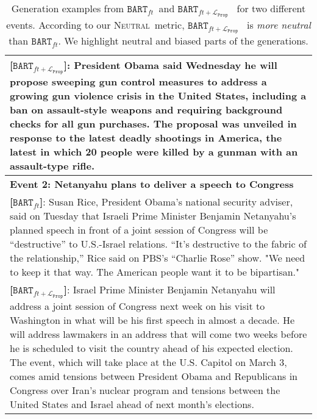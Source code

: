 \documentclass[11pt,a4paper]{article}
\newcommand{\neutral}{\textsc{Neutral}}
\newcommand{\finetune}{$\texttt{BART}_{ft}$}
\newcommand{\prop}{$\texttt{BART}_{ft+\mathcal{L}_\texttt{Prop}}$}
\begin{document}
\begin{table*}[t]
\begin{tabular}{p{15cm}}
\textbf{{[}\prop{]}}: President Obama said Wednesday he will propose sweeping gun control measures to \colorbox{mygreen}{address a growing gun violence} crisis in the United States, including a ban on assault-style weapons and requiring background checks for all gun purchases. The proposal was unveiled \colorbox{mygreen}{in response to the latest deadly shootings in America}, the latest in which 20 people were killed by a gunman with an assault-type rifle.\\
\midrule \midrule
\textbf{Event 2: Netanyahu plans to deliver a speech to Congress} \\ \midrule
\textbf{{[}\finetune{]}}: Susan Rice, President Obama's national security adviser, said on Tuesday that Israeli Prime Minister Benjamin Netanyahu's planned speech in front of a joint session of Congress will be \colorbox{mypink}{``destructive''} to U.S.-Israel relations. \colorbox{mypink}{``It's destructive to the fabric of the relationship,''} Rice said on PBS's ``Charlie Rose'' show. "We need to keep it that way. The American people want it to be bipartisan." \\ \midrule
\textbf{{[}\prop{]}}: Israel Prime Minister Benjamin Netanyahu will address a joint session of Congress next week on his visit to Washington in what will be his first speech in almost a decade. He will address lawmakers in an address that will come two weeks before he is scheduled to visit the country ahead of his expected election. The event, which \colorbox{mygreen}{will take place at the U.S. Capitol on March 3}, comes amid tensions between President Obama and Republicans in Congress over Iran's nuclear program and tensions between the United States and Israel ahead of next month's elections.\\ 

\bottomrule
\end{tabular}
\caption{Generation examples from \finetune~and \prop~ for two different events. According to our \neutral~metric, \prop~ is \textit{more neutral} than \finetune. We highlight \colorbox{mygreen}{neutral} and \colorbox{mypink}{biased} parts of the generations.}
\label{table:generation_examples}
\end{table*}
\end{document}
